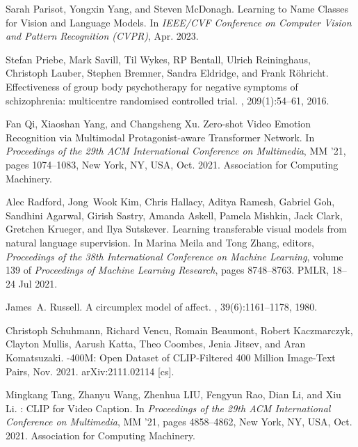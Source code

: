 \documentclass[10pt,twocolumn,letterpaper]{article}
\begin{document}
{\begin{thebibliography}{10}
Sarah Parisot, Yongxin Yang, and Steven McDonagh.
\newblock Learning to {Name} {Classes} for {Vision} and {Language} {Models}.
\newblock In {\em IEEE/CVF Conference on Computer Vision and Pattern
  Recognition (CVPR)}, Apr. 2023.

Stefan Priebe, Mark Savill, Til Wykes, RP Bentall, Ulrich Reininghaus,
  Christoph Lauber, Stephen Bremner, Sandra Eldridge, and Frank Röhricht.
\newblock Effectiveness of group body psychotherapy for negative symptoms of
  schizophrenia: multicentre randomised controlled trial.
, 209(1):54--61, 2016.

Fan Qi, Xiaoshan Yang, and Changsheng Xu.
\newblock Zero-shot {Video} {Emotion} {Recognition} via {Multimodal}
  {Protagonist}-aware {Transformer} {Network}.
\newblock In {\em Proceedings of the 29th {ACM} {International} {Conference} on
  {Multimedia}}, {MM} '21, pages 1074--1083, New York, NY, USA, Oct. 2021.
  Association for Computing Machinery.

Alec Radford, Jong~Wook Kim, Chris Hallacy, Aditya Ramesh, Gabriel Goh,
  Sandhini Agarwal, Girish Sastry, Amanda Askell, Pamela Mishkin, Jack Clark,
  Gretchen Krueger, and Ilya Sutskever.
\newblock Learning transferable visual models from natural language
  supervision.
\newblock In Marina Meila and Tong Zhang, editors, {\em Proceedings of the 38th
  International Conference on Machine Learning}, volume 139 of {\em Proceedings
  of Machine Learning Research}, pages 8748--8763. PMLR, 18--24 Jul 2021.

James~A. Russell.
\newblock A circumplex model of affect.
, 39(6):1161--1178,
  1980.

Christoph Schuhmann, Richard Vencu, Romain Beaumont, Robert Kaczmarczyk,
  Clayton Mullis, Aarush Katta, Theo Coombes, Jenia Jitsev, and Aran
  Komatsuzaki.
-{400M}: {Open} {Dataset} of {CLIP}-{Filtered} 400 {Million}
  {Image}-{Text} {Pairs}, Nov. 2021.
\newblock arXiv:2111.02114 [cs].

Mingkang Tang, Zhanyu Wang, Zhenhua LIU, Fengyun Rao, Dian Li, and Xiu Li.
: {CLIP} for {Video} {Caption}.
\newblock In {\em Proceedings of the 29th {ACM} {International} {Conference} on
  {Multimedia}}, {MM} '21, pages 4858--4862, New York, NY, USA, Oct. 2021.
  Association for Computing Machinery.


\end{thebibliography}}
\end{document}

